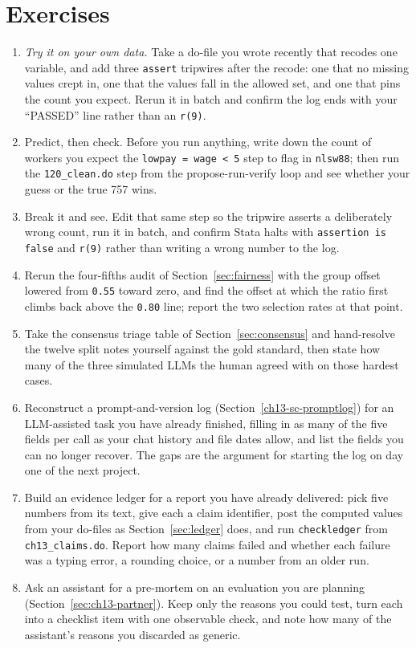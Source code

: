 \section*{Exercises}
\begin{enumerate}
    \item \emph{Try it on your own data.} Take a do-file you wrote recently that recodes one variable, and add three \texttt{assert} tripwires after the recode: one that no missing values crept in, one that the values fall in the allowed set, and one that pins the count you expect. Rerun it in batch and confirm the log ends with your \enquote{PASSED} line rather than an \texttt{r(9)}.
    \item Predict, then check. Before you run anything, write down the count of workers you expect the \texttt{lowpay = wage < 5} step to flag in \texttt{nlsw88}; then run the \texttt{120\_clean.do} step from the propose-run-verify loop and see whether your guess or the true 757 wins.
    \item Break it and see. Edit that same step so the tripwire asserts a deliberately wrong count, run it in batch, and confirm Stata halts with \texttt{assertion is false} and \texttt{r(9)} rather than writing a wrong number to the log.
    \item Rerun the four-fifths audit of Section~\ref{sec:fairness} with the group offset lowered from \texttt{0.55} toward zero, and find the offset at which the ratio first climbs back above the \texttt{0.80} line; report the two selection rates at that point.
    \item Take the consensus triage table of Section~\ref{sec:consensus} and hand-resolve the twelve split notes yourself against the gold standard, then state how many of the three simulated LLMs the human agreed with on those hardest cases.
    \item Reconstruct a prompt-and-version log (Section~\ref{ch13-sc-promptlog}) for an LLM-assisted task you have already finished, filling in as many of the five fields per call as your chat history and file dates allow, and list the fields you can no longer recover. The gaps are the argument for starting the log on day one of the next project.
    \item Build an evidence ledger for a report you have already delivered: pick five numbers from its text, give each a claim identifier, post the computed values from your do-files as Section~\ref{sec:ledger} does, and run \texttt{checkledger} from \texttt{ch13\_claims.do}. Report how many claims failed and whether each failure was a typing error, a rounding choice, or a number from an older run.
    \item Ask an assistant for a pre-mortem on an evaluation you are planning (Section~\ref{sec:ch13-partner}). Keep only the reasons you could test, turn each into a checklist item with one observable check, and note how many of the assistant's reasons you discarded as generic.
\end{enumerate}
